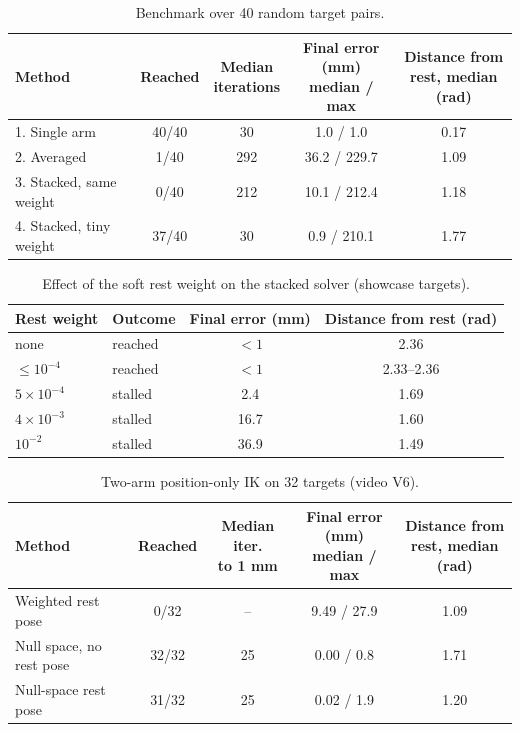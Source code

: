 \begin{table}[H]
    \centering
    \small
    \begin{tabular}{lcccc}
        \toprule
        Method & Reached & \shortstack{Median\\iterations} & \shortstack{Final error (mm)\\median / max} &
        \shortstack{Distance from\\rest, median (rad)} \\
        \midrule
        1. Single arm & 40/40 & 30 & 1.0 / 1.0 & 0.17 \\
        2. Averaged & 1/40 & 292 & 36.2 / 229.7 & 1.09 \\
        3. Stacked, same weight & 0/40 & 212 & 10.1 / 212.4 & 1.18 \\
        4. Stacked, tiny weight & 37/40 & 30 & 0.9 / 210.1 & 1.77 \\
        \bottomrule
    \end{tabular}
    \caption{\small{Benchmark over 40 random target pairs.}}
    \label{tab:app_bimanual40}
\end{table}

\begin{table}[H]
    \centering
    \small
    \begin{tabular}{llcc}
        \toprule
        Rest weight & Outcome & Final error (mm) & Distance from rest (rad) \\
        \midrule
        none & reached & $<1$ & 2.36 \\
        $\le 10^{-4}$ & reached & $<1$ & 2.33--2.36 \\
        $5\times10^{-4}$ & stalled & 2.4 & 1.69 \\
        $4\times10^{-3}$ & stalled & 16.7 & 1.60 \\
        $10^{-2}$ & stalled & 36.9 & 1.49 \\
        \bottomrule
    \end{tabular}
    \caption{\small{Effect of the soft rest weight on the stacked solver (showcase targets).}}
    \label{tab:app_sweep}
\end{table}

\begin{table}[H]
    \centering
    \small
    \begin{tabular}{lcccc}
        \toprule
        Method & Reached & \shortstack{Median iter.\\to 1 mm} & \shortstack{Final error (mm)\\median / max} &
        \shortstack{Distance from\\rest, median (rad)} \\
        \midrule
        Weighted rest pose & 0/32 & -- & 9.49 / 27.9 & 1.09 \\
        Null space, no rest pose & 32/32 & 25 & 0.00 / 0.8 & 1.71 \\
        Null-space rest pose & 31/32 & 25 & 0.02 / 1.9 & 1.20 \\
        \bottomrule
    \end{tabular}
    \caption{\small{Two-arm position-only IK on 32 targets (video V6).}}
    \label{tab:app_nullspace}
\end{table}

